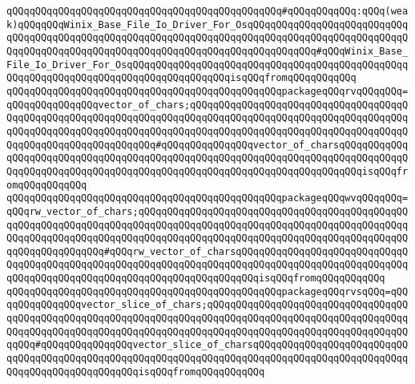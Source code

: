 \newline
\verb|qQQqqQQqqQQqqQQqqQQqqQQqqQQqqQQqqQQqqQQqqQQqqQQq#qQQqqQQqqQQq:qQQq(weak)qQQqqQQqWinix_Base_File_Io_Driver_For_OsqQQqqQQqqQQqqQQqqQQqqQQqqQQqqQQqqQQqqQQqqQQqqQQqqQQqqQQqqQQqqQQqqQQqqQQqqQQqqQQqqQQqqQQqqQQqqQQqqQQqqQQqqQQqqQQqqQQqqQQqqQQqqQQqqQQqqQQqqQQqqQQqqQQqqQQq#qQQqWinix_Base_File_Io_Driver_For_OsqQQqqQQqqQQqqQQqqQQqqQQqqQQqqQQqqQQqqQQqqQQqqQQqqQQqqQQqqQQqqQQqqQQqqQQqqQQqqQQqqQQqqQQqisqQQqfromqQQqqQQqqQQq|\newline
\newline
\verb|qQQqqQQqqQQqqQQqqQQqqQQqqQQqqQQqqQQqqQQqqQQqqQQqpackageqQQqrvqQQqqQQq=qQQqqQQqqQQqqQQqvector_of_chars;qQQqqQQqqQQqqQQqqQQqqQQqqQQqqQQqqQQqqQQqqQQqqQQqqQQqqQQqqQQqqQQqqQQqqQQqqQQqqQQqqQQqqQQqqQQqqQQqqQQqqQQqqQQqqQQqqQQqqQQqqQQqqQQqqQQqqQQqqQQqqQQqqQQqqQQqqQQqqQQqqQQqqQQqqQQqqQQqqQQqqQQqqQQqqQQqqQQqqQQqqQQq#qQQqqQQqqQQqqQQqvector_of_charsqQQqqQQqqQQqqQQqqQQqqQQqqQQqqQQqqQQqqQQqqQQqqQQqqQQqqQQqqQQqqQQqqQQqqQQqqQQqqQQqqQQqqQQqqQQqqQQqqQQqqQQqqQQqqQQqqQQqqQQqqQQqqQQqqQQqqQQqqQQqqQQqisqQQqfromqQQqqQQqqQQq|\newline
\verb|qQQqqQQqqQQqqQQqqQQqqQQqqQQqqQQqqQQqqQQqqQQqqQQqpackageqQQqwvqQQqqQQq=qQQqrw_vector_of_chars;qQQqqQQqqQQqqQQqqQQqqQQqqQQqqQQqqQQqqQQqqQQqqQQqqQQqqQQqqQQqqQQqqQQqqQQqqQQqqQQqqQQqqQQqqQQqqQQqqQQqqQQqqQQqqQQqqQQqqQQqqQQqqQQqqQQqqQQqqQQqqQQqqQQqqQQqqQQqqQQqqQQqqQQqqQQqqQQqqQQqqQQqqQQqqQQqqQQqqQQqqQQq#qQQqrw_vector_of_charsqQQqqQQqqQQqqQQqqQQqqQQqqQQqqQQqqQQqqQQqqQQqqQQqqQQqqQQqqQQqqQQqqQQqqQQqqQQqqQQqqQQqqQQqqQQqqQQqqQQqqQQqqQQqqQQqqQQqqQQqqQQqqQQqqQQqqQQqqQQqqQQqisqQQqfromqQQqqQQqqQQq|\newline
\newline
\verb|qQQqqQQqqQQqqQQqqQQqqQQqqQQqqQQqqQQqqQQqqQQqqQQqpackageqQQqrvsqQQq=qQQqqQQqqQQqqQQqvector_slice_of_chars;qQQqqQQqqQQqqQQqqQQqqQQqqQQqqQQqqQQqqQQqqQQqqQQqqQQqqQQqqQQqqQQqqQQqqQQqqQQqqQQqqQQqqQQqqQQqqQQqqQQqqQQqqQQqqQQqqQQqqQQqqQQqqQQqqQQqqQQqqQQqqQQqqQQqqQQqqQQqqQQqqQQqqQQqqQQqqQQqqQQq#qQQqqQQqqQQqqQQqvector_slice_of_charsqQQqqQQqqQQqqQQqqQQqqQQqqQQqqQQqqQQqqQQqqQQqqQQqqQQqqQQqqQQqqQQqqQQqqQQqqQQqqQQqqQQqqQQqqQQqqQQqqQQqqQQqqQQqqQQqqQQqqQQqisqQQqfromqQQqqQQqqQQq|\newline
